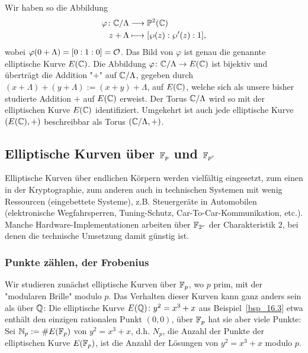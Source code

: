 Wir haben so die Abbildung
\begin{equation}
\begin{aligned}
	\varphi \colon \mathbb{C} / \Lambda &\longrightarrow \mathbb{P}^2(\mathbb{C}) \\
	z+\Lambda &\longmapsto [\wp(z) : \wp'(z) : 1],
\end{aligned}
\end{equation}
wobei $\varphi(0 + \Lambda) = [0:1:0] = \mathcal{O}$.
Das Bild von $\varphi$ ist genau die genannte elliptische Kurve $E(\mathbb{C})$.
Die Abbildung $\varphi \colon \mathbb{C}/\Lambda \rightarrow E(\mathbb{C})$ ist bijektiv und überträgt die Addition "$+$" auf $\mathbb{C}/\Lambda$, gegeben durch $(x+\Lambda) + (y+\Lambda) := (x+y) + \Lambda$, auf $E(\mathbb{C})$, welche sich als unsere bisher studierte Addition $+$ auf $E(\mathbb{C})$ erweist.
Der Torus $\mathbb{C}/\Lambda$ wird so mit der elliptischen Kurve $E(\mathbb{C})$ identifiziert.
Umgekehrt ist auch jede elliptische Kurve $(E(\mathbb{C}),+)$ beschreibbar als Torus $(\mathbb{C}/\Lambda,+)$.

\nextlecture
\newpage
\subsection{Elliptische Kurven über $\mathbb{F}_p$ und $\mathbb{F}_{p^r}$}
\label{sub:3.3}
\begin{bem}
	Elliptische Kurven über endlichen Körpern werden vielfältig eingesetzt, \marginnote{[17]} zum einen in der Kryptographie, zum anderen auch in technischen Systemen mit wenig Ressourcen (eingebettete Systeme), z.B. Steuergeräte in Automobilen (elektronische Wegfahrsperren, Tuning-Schutz, Car-To-Car-Kommunikation, etc.).
	Manche Hardware-Implementationen arbeiten über $\mathbb{F}_{2^r}$ der Charakteristik $2$, bei denen die technische Umsetzung damit günstig ist.
\end{bem}

\subsubsection{Punkte zählen, der Frobenius}
\label{subsub:3.3.1}
\begin{bem}
	Wir studieren zunächst elliptische Kurven über $\mathbb{F}_p$, wo $p$ prim, mit der "modularen Brille" modulo $p$.
	Das Verhalten dieser Kurven kann ganz anders sein als über $\mathbb{Q}$:
	Die elliptische Kurve $E(\mathbb{Q})\colon y^2 = x^3 + x$ aus Beispiel~\ref{bsp_16.3} etwa enthält den einzigen rationalen Punkt $(0,0)$, über $\mathbb{F}_p$ hat sie aber viele Punkte:
	Sei $\mathbb{N}_p := \#E(\mathbb{F}_p)$ von $y^2 = x^3 + x$, d.h. $N_p$, die Anzahl der Punkte der elliptischen Kurve $E(\mathbb{F}_p)$, ist die Anzahl der Lösungen von $y^2 = x^3 + x$ modulo $p$.
\end{bem}

